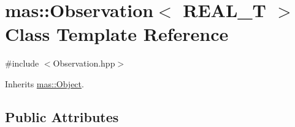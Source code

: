 \hypertarget{classmas_1_1_observation}{}\section{mas\+:\+:Observation$<$ R\+E\+A\+L\+\_\+\+T $>$ Class Template Reference}
\label{classmas_1_1_observation}


{\ttfamily \#include $<$Observation.\+hpp$>$}



Inherits \hyperlink{classmas_1_1_object}{mas\+::\+Object}.

\subsection*{Public Attributes}
